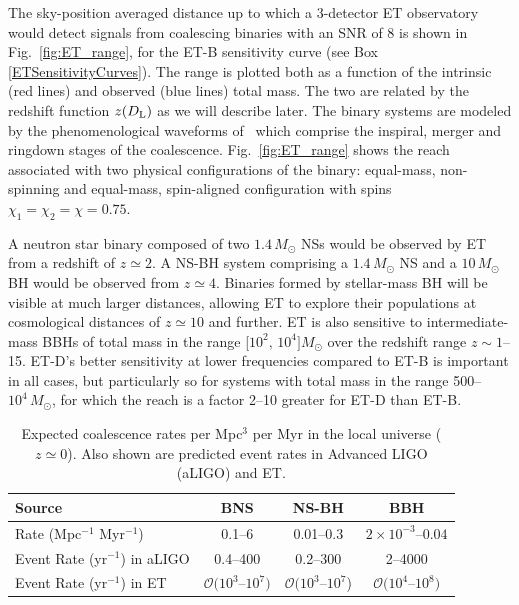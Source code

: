 The sky-position averaged distance up to which a 3-detector ET 
observatory would detect signals from coalescing binaries with 
an SNR of 8 is shown in Fig.~\ref{fig:ET_range}, for the ET-B sensitivity 
curve (see Box\,\ref{ETSensitivityCurves}). 
The range is plotted both as a function of the intrinsic (red lines)
and observed (blue lines) total mass. The two are related by the
redshift function $z(D_{\rm L})$ as we will describe later.
The binary systems are modeled by
the phenomenological waveforms of~\cite{Santamaria:2010yb} which
comprise the inspiral, merger and ringdown stages of the coalescence.
Fig.~\ref{fig:ET_range} shows the reach associated
with two physical configurations of the
binary: equal-mass, non-spinning and equal-mass, spin-aligned configuration 
with spins $\chi_1=\chi_2=\chi=0.75$.

A neutron star binary composed of two $1.4\,M_\odot$ NSs would be 
observed by ET from a redshift of $z\simeq 2$. A NS-BH
system comprising a $1.4\,M_\odot$ NS and a $10\,M_\odot$ BH
would be observed from $z \simeq 4$. Binaries formed by stellar-mass BH
will be visible at much larger distances, allowing ET to explore their populations
at cosmological distances of $z\simeq 10$ and further. ET is also sensitive to
intermediate-mass BBHs of total mass in the range [$10^2,\,10^4]M_\odot$
over the redshift range $z\sim1$--15. ET-D's better sensitivity at lower 
frequencies compared to ET-B is important in all cases, but particularly 
so for systems with total mass in the range 500--$10^4\,M_\odot$, for which the
reach is a factor 2--10 greater for ET-D than ET-B.

\begin{table}[ht]
\begin{center}
\caption{
Expected coalescence rates per Mpc$^3$ per Myr in the local universe
($z\simeq 0$).  Also shown are predicted event rates in Advanced LIGO (aLIGO) 
and ET.}
\begin{tabular}{l|ccc}
\hline
\hline
 Source                & BNS              & NS-BH            & BBH            \\
\hline
Rate (Mpc$^{-1}$ Myr$^{-1}$)   &  0.1--6           & 0.01--0.3         & $2\times 10^{-3}$--$0.04$\\
Event Rate (yr$^{-1}$) in aLIGO & 0.4--400          & 0.2--300          & 2--4000          \\
Event Rate (yr$^{-1}$) in ET   & $\mathcal{O}(10^3$--$10^7)$ & $\mathcal{O}(10^3$--$10^7$) & $\mathcal{O}(10^4$--$10^8)$\\
\hline
\hline
\end{tabular}
\label{tab:EventRates}
\end{center}
\end{table}


